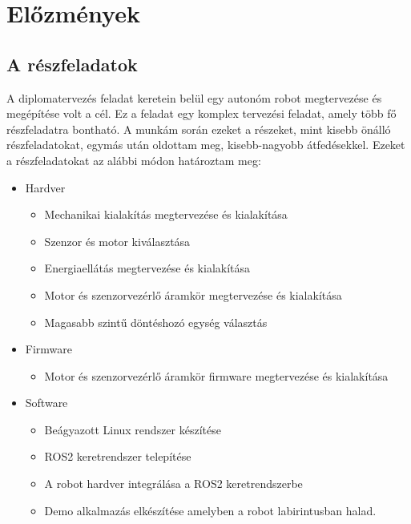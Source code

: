\chapter{Előzmények}

\section{A részfeladatok}

A diplomatervezés feladat keretein belül egy autonóm robot megtervezése és
megépítése volt a cél. Ez a feladat egy komplex tervezési feladat, amely több fő
részfeladatra bontható. A munkám során ezeket a részeket, mint kisebb önálló
részfeladatokat, egymás után oldottam meg, kisebb-nagyobb átfedésekkel. Ezeket a
részfeladatokat az alábbi módon határoztam meg:

\begin{itemize}
\item Hardver
  \begin{itemize}
  \item Mechanikai kialakítás megtervezése és kialakítása
  \item Szenzor és motor kiválasztása
  \item Energiaellátás megtervezése és kialakítása
  \item Motor és szenzorvezérlő áramkör megtervezése és kialakítása
  \item Magasabb szintű döntéshozó egység választás
  \end{itemize}
\item{Firmware}
  \begin{itemize}
  \item Motor és szenzorvezérlő áramkör firmware megtervezése és kialakítása
  \end{itemize}
\item{Software}
  \begin{itemize}
  \item Beágyazott Linux rendszer készítése
  \item ROS2 keretrendszer telepítése
  \item A robot hardver integrálása a ROS2 keretrendszerbe
  \item Demo alkalmazás elkészítése amelyben a robot labirintusban halad.
  \end{itemize}
\end{itemize}

